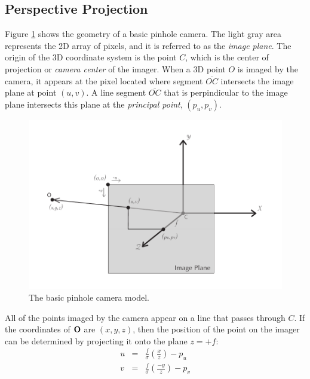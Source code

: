 \subsection{Perspective Projection}

Figure \ref{fig:pinhole-camera-diagram} shows the geometry of a basic
pinhole camera.  The light gray area represents the 2D array of
pixels, and it is referred to as the {\em image plane}.  The origin of
the 3D coordinate system is the point $C$, which is the center of
projection or {\em camera center} of the imager.  When a 3D point $O$
is imaged by the camera, it appears at the pixel located where segment
$\overline{OC}$ intersects the image plane at point $(u,v)$.  A line
segment $\overline{OC}$ that is perpindicular to the image plane
intersects this plane at the {\em principal point}, $(p_u, p_v)$.

\begin{figure}[tbp]
\begin{center}
  \includegraphics[width=6in]{images/camera_module_pinhole.pdf}
 \end{center}
  \caption{The basic pinhole camera model.}
  \label{fig:pinhole-camera-diagram}
\end{figure}

All of the points imaged by the camera appear on a line that passes
through $C$.  If the coordinates of ${\bf O}$ are $(x,y,z)$, then the
position of the point on the imager can be determined by projecting it
onto the plane $ z = +f$:
\begin{eqnarray}
\label{eqn:forward-projection-1}
u &=& \frac{f}{\sigma} \left(\frac{x}{z}\right) - p_u \\
\label{eqn:forward-projection-2}
v &=& \frac{f}{\sigma} \left(\frac{-y}{z}\right) - p_v
\end{eqnarray}

